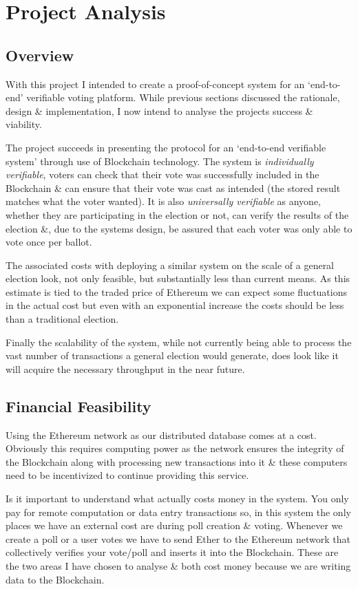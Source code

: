 \documentclass{article}
\begin{document}
    \section{Project Analysis}
    \subsection{Overview}
	With this project I intended to create a proof-of-concept system for an `end-to-end' verifiable voting platform. While previous sections discussed the rationale, design \& implementation, I now intend to analyse the projects success \& viability.

	The project succeeds in presenting the protocol for an `end-to-end verifiable system' through use of Blockchain technology. The system is \textit{individually verifiable}, voters can check that their vote was successfully included in the Blockchain \& can ensure that their vote was cast as intended (the stored result matches what the voter wanted). It is also \textit{universally verifiable} as anyone, whether they are participating in the election or not, can verify the results of the election \&, due to the systems design, be assured that each voter was only able to vote once per ballot.
	
	The associated costs with deploying a similar system on the scale of a general election look, not only feasible, but substantially less than current means. As this estimate is tied to the traded price of Ethereum we can expect some fluctuations in the actual cost but even with an exponential increase the costs should be less than a traditional election.
	
	Finally the scalability of the system, while not currently being able to process the vast number of transactions a general election would generate, does look like it will acquire the necessary throughput in the near future.

    \cleardoublepage
    \subsection{Financial Feasibility}
	Using the Ethereum network as our distributed database comes at a cost. Obviously this requires computing power as the network ensures the integrity of the Blockchain along with processing new transactions into it \& these computers need to be incentivized to continue providing this service.
	
	Is it important to understand what actually costs money in the system. You only pay for remote computation or data entry transactions so, in this system the only places we have an external cost are during poll creation \& voting. Whenever we create a poll or a user votes we have to send Ether to the Ethereum network that collectively verifies your vote/poll and inserts it into the Blockchain. These are the two areas I have chosen to analyse \& both cost money because we are writing data to the Blockchain.
	
\end{document}
